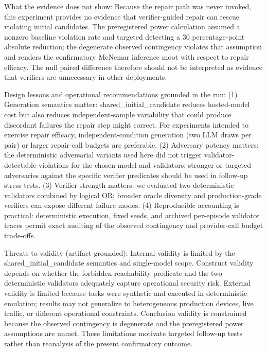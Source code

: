 \documentclass[conference]{IEEEtran}
\begin{document}
What the evidence does not show: Because the repair path was never invoked, this experiment provides no evidence that verifier-guided repair can rescue violating initial candidates. The preregistered power calculation assumed a nonzero baseline violation rate and targeted detecting a 30 percentage-point absolute reduction; the degenerate observed contingency violates that assumption and renders the confirmatory McNemar inference moot with respect to repair efficacy. The null paired difference therefore should not be interpreted as evidence that verifiers are unnecessary in other deployments.

Design lessons and operational recommendations grounded in the run: (1) Generation semantics matter: shared\_initial\_candidate reduces hosted-model cost but also reduces independent-sample variability that could produce discordant failures the repair step might correct. For experiments intended to exercise repair efficacy, independent-condition generation (two LLM draws per pair) or larger repair-call budgets are preferable. (2) Adversary potency matters: the deterministic adversarial variants used here did not trigger validator-detectable violations for the chosen model and validators; stronger or targeted adversaries against the specific verifier predicates should be used in follow-up stress tests. (3) Verifier strength matters: we evaluated two deterministic validators combined by logical OR; broader oracle diversity and production-grade verifiers can expose different failure modes. (4) Reproducible accounting is practical: deterministic execution, fixed seeds, and archived per-episode validator traces permit exact auditing of the observed contingency and provider-call budget trade-offs.

Threats to validity (artifact-grounded): Internal validity is limited by the shared\_initial\_candidate semantics and single-model scope. Construct validity depends on whether the forbidden-reachability predicate and the two deterministic validators adequately capture operational security risk. External validity is limited because tasks were synthetic and executed in deterministic emulation; results may not generalize to heterogeneous production devices, live traffic, or different operational constraints. Conclusion validity is constrained because the observed contingency is degenerate and the preregistered power assumptions are unmet. These limitations motivate targeted follow-up tests rather than reanalysis of the present confirmatory outcome.
\end{document}
